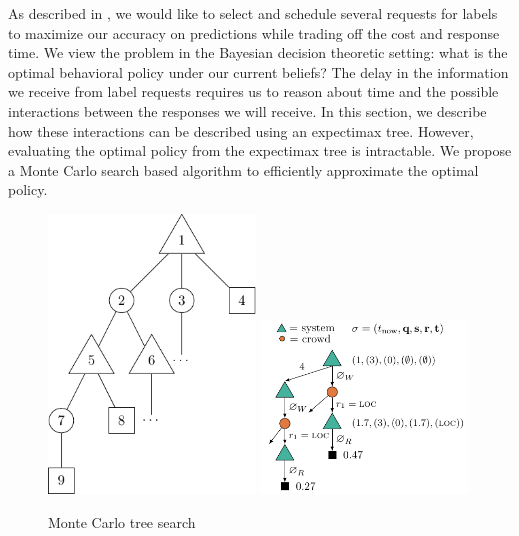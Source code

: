 As described in , we would like to select and schedule several requests for labels to maximize our accuracy on predictions while trading off the cost and response time. 
We view the problem in the Bayesian decision theoretic setting: what is the optimal behavioral policy under our current beliefs?
The delay in the information we receive from label requests requires us to reason about time and the possible interactions between the responses we will receive.
In this section, we describe how these interactions can be described using an expectimax tree.
However, evaluating the optimal policy from the expectimax tree is intractable.
We propose a Monte Carlo search based algorithm to efficiently approximate the optimal policy.


\begin{figure}
  \includegraphics[width=0.49\textwidth,height=0.23\textheight,keepaspectratio]{figures/mcts.pdf}
  \hfill
  \includegraphics[width=0.49\textwidth,height=0.23\textheight,keepaspectratio]{figures/mcts_simple.pdf}
  \caption{Monte Carlo tree search}
\label{fig:mcts}
\end{figure}

